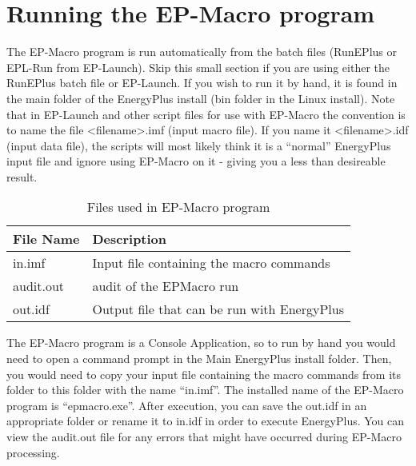 \section{Running the EP-Macro program}\label{running-the-ep-macro-program}

The EP-Macro program is run automatically from the batch files (RunEPlus or EPL-Run from EP-Launch). Skip this small section if you are using either the RunEPlus batch file or EP-Launch. If you wish to run it by hand, it is found in the main folder of the EnergyPlus install (bin folder in the Linux install). Note that in EP-Launch and other script files for use with EP-Macro the convention is to name the file \textless{}filename\textgreater{}.imf (input macro file). If you name it \textless{}filename\textgreater{}.idf (input data file), the scripts will most likely think it is a ``normal'' EnergyPlus input file and ignore using EP-Macro on it - giving you a less than desireable result.

\begin{longtable}[c]{@{}ll@{}}
\caption{Files used in EP-Macro program \protect \label{table:files-used-in-ep-macro-program}}\\
\toprule 
File Name & Description \tabularnewline \midrule
\endhead
in.imf & Input file containing the macro commands \tabularnewline
audit.out & audit of the EPMacro run \tabularnewline
out.idf & Output file that can be run with EnergyPlus \tabularnewline
\bottomrule
\end{longtable}

The EP-Macro program is a Console Application, so to run by hand you would need to open a command prompt in the Main EnergyPlus install folder. Then, you would need to copy your input file containing the macro commands from its folder to this folder with the name ``in.imf''. The installed name of the EP-Macro program is ``epmacro.exe''. After execution, you can save the out.idf in an appropriate folder or rename it to in.idf in order to execute EnergyPlus. You can view the audit.out file for any errors that might have occurred during EP-Macro processing.
